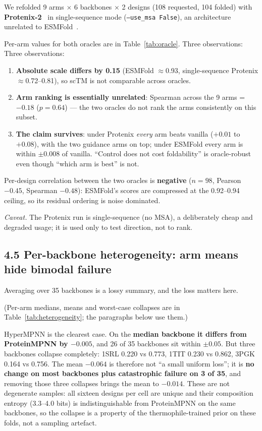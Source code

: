 We refolded 9 arms $\times$ 6 backbones $\times$ 2 designs (108 requested, 104 folded) with
\textbf{Protenix-2}~\cite{protenix} in single-sequence mode
(\texttt{--use\_msa False}), an architecture unrelated to
ESMFold~\cite{esmfold}.

Per-arm values for both oracles are in Table~\ref{tab:oracle}. Three observations:
Three observations:
\begin{enumerate}
\item \textbf{Absolute scale differs by 0.15} (ESMFold $\approx$0.93,
  single-sequence Protenix $\approx$0.72--0.81), so scTM is not comparable
  across oracles.
\item \textbf{Arm ranking is essentially unrelated}: Spearman across the 9 arms
  = $\bm{-0.18}$ ($p = 0.64$) --- the two oracles do not rank the arms
  consistently on this subset.
\item \textbf{The claim survives}: under Protenix \emph{every} arm beats
  vanilla ($+0.01$ to $+0.08$), with the two guidance arms on top; under
  ESMFold every arm is within $\pm 0.008$ of vanilla. ``Control does not cost
  foldability'' is oracle-robust even though ``which arm is best'' is not.
\end{enumerate}

Per-design correlation between the two oracles is \textbf{negative}
($n = 98$, Pearson $-0.45$, Spearman $-0.48$): ESMFold's scores are compressed
at the 0.92--0.94 ceiling, so its residual ordering is noise dominated.

\emph{Caveat.} The Protenix run is single-sequence (no MSA), a deliberately
cheap and degraded usage; it is used only to test direction, not to rank.

\subsection*{4.5 Per-backbone heterogeneity: arm means hide bimodal failure}
\label{sec:heterogeneity}

Averaging over 35 backbones is a lossy summary, and the loss matters here.

(Per-arm medians, means and worst-case collapses are in
Table~\ref{tab:heterogeneity}; the paragraphs below use them.)


HyperMPNN is the clearest case. On the \textbf{median backbone it differs from
ProteinMPNN by $\bm{-0.005}$}, and 26 of 35 backbones sit within $\pm 0.05$. But
three backbones collapse completely: 1SRL 0.220 vs 0.773, 1TIT 0.230 vs 0.862,
3PGK 0.164 vs 0.756. The mean $-0.064$ is therefore not ``a small uniform loss'';
it is \textbf{no change on most backbones plus catastrophic failure on 3 of 35},
and removing those three collapses brings the mean to $-0.014$. These are not
degenerate samples: all sixteen designs per cell are unique and their composition
entropy (3.3--4.0 bits) is indistinguishable from ProteinMPNN on the same
backbones, so the collapse is a property of the thermophile-trained prior on
these folds, not a sampling artefact.

